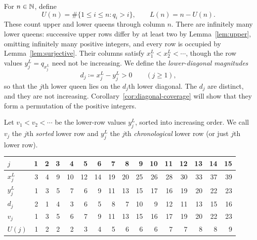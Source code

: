 For $n\in\mathbb N$, define
\begin{equation}\label{eq:counts}
 U(n)=\#\{1\le i\le n:q_i>i\},\qquad L(n)=n-U(n).
\end{equation}
These count upper and lower queens through column $n$. There are infinitely many lower queens: successive upper rows differ by at least two by Lemma~\ref{lem:upper}, omitting infinitely many positive integers, and every row is occupied by Lemma~\ref{lem:surjective}.
Their columns satisfy $x_1^L<x_2^L<\cdots$, though the row values $y_j^L=q_{x_j^L}$ need not be increasing. We define the \emph{lower-diagonal magnitudes}
\begin{equation}\label{eq:rank-definition}
 d_j\coloneqq x_j^L-y_j^L>0\qquad(j\ge1),
\end{equation}
so that the $j$th lower queen lies on the $d_j$th lower diagonal.
The $d_j$ are distinct, and they are not increasing. Corollary~\ref{cor:diagonal-coverage}
will show that they form a permutation of the positive integers.

Let $v_1<v_2<\cdots$ be the lower-row values $y_j^L$, sorted into increasing order. We call $v_j$ the $j$th \emph{sorted} lower row
and $y_j^L$ the $j$th \emph{chronological} lower row (or just $j$th lower row).


\begin{center}
\begin{minipage}{\linewidth}
\centering
\renewcommand{\arraystretch}{1.15}
\setlength{\tabcolsep}{6pt}
\begin{tabular}{@{}l*{15}{r}@{}}
\toprule
$j$     & 1 & 2 & 3 & 4 & 5 & 6 & 7 & 8 & 9 & 10 & 11 & 12 & 13 & 14 & 15 \\
\midrule
$x_j^L$ & 3 & 4 & 9 & 10 & 12 & 14 & 19 & 20 & 25 & 26 & 28 & 30 & 33 & 37 & 39 \\
$y_j^L$ & 1 & 3 & 5 & 7 & 6 & 9 & 11 & 13 & 15 & 17 & 16 & 19 & 20 & 22 & 23 \\
$d_j$   & 2 & 1 & 4 & 3 & 6 & 5 & 8 & 7 & 10 & 9 & 12 & 11 & 13 & 15 & 16 \\
$v_j$   & 1 & 3 & 5 & 6 & 7 & 9 & 11 & 13 & 15 & 16 & 17 & 19 & 20 & 22 & 23 \\
$U(j)$  & 1 & 2 & 2 & 2 & 3 & 4 & 5 & 6 & 6 & 6 & 7 & 7 & 8 & 8 & 9 \\
\bottomrule
\end{tabular}
\par
{}
\label{tab:lower-values}
\end{minipage}
\end{center}
\vspace{\baselineskip}

